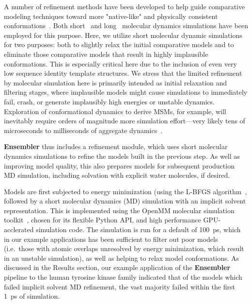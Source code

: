 \documentclass[aps,pre,twocolumn,nofootinbib,superscriptaddress,linenumbers]{revtex4-1}
\begin{document}
A number of refinement methods have been developed to help guide comparative modeling techniques toward more "native-like" and physically consistent conformations~\cite{maccallum:prot:2011:casp-refinement,zhang:curr-opin-struct-biol:2009:structure-prediction}.
Both short~\cite{zhang:curr-opin-struct-biol:2009:structure-prediction} and long~\cite{raval:prot:2012:long-timescale-md-refinement} molecular dynamics simulations have been employed for this purpose.
Here, we utilize short molecular dynamic simulations for two purposes: both to slightly relax the initial comparative models and to eliminate those comparative models that result in highly implausible conformations.
This is especially critical here due to the inclusion of even very low sequence identity template structures.
We stress that the limited refinement by molecular simulation here is primarily intended as initial relaxation and filtering stages, where implausible models might cause simulations to immediately fail, crash, or generate implausibly high energies or unstable dynamics.
Exploration of conformational dynamics to derive MSMs, for example, will inevitably require orders of magnitude more simulation effort---very likely tens of microseconds to milliseconds of aggregate dynamics~\cite{pande-beauchamp-bowman:2010:methods:markov-model-review,chodera-noe:curr-opin-struct-biol:2014:msm-review}.
\color{black}

{\bf Ensembler} thus includes a refinement module, which uses short molecular dynamics simulations to refine the models built in the previous step.
As well as improving model quality, this also prepares models for subsequent production MD simulation, including solvation with explicit water molecules, if desired.

Models are first subjected to energy minimization (using the L-BFGS algorithm~\cite{lbfgs}, followed by a short molecular dynamics (MD) simulation with an implicit solvent representation.
This is implemented using the OpenMM molecular simulation toolkit~\cite{eastman:jctc:2012:openmm}, chosen for its flexible Python API, and high performance GPU-acclerated simulation code.
The simulation is run for a default of 100~ps, which in our example applications has been sufficient to filter out poor models (i.e.~those with atomic overlaps unresolved by energy minimization, which result in an unstable simulation), as well as helping to relax model conformations.
As discussed in the Results section, our example application of the {\bf Ensembler} pipeline to the human tyrosine kinase family indicated that of the models which failed implicit solvent MD refinement, the vast majority failed within the first 1~ps of simulation.
\end{document}
